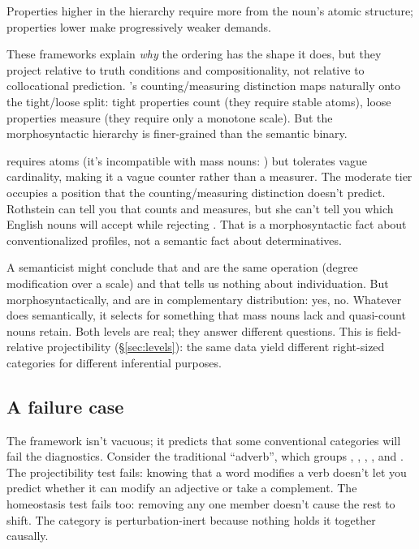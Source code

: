 \documentclass[12pt,a4paper]{article}
\begin{document}
Properties higher in the hierarchy require more from the noun's atomic structure; properties lower make progressively weaker demands.

These frameworks explain \textit{why} the ordering has the shape it does, but they project relative to truth conditions and compositionality, not relative to collocational prediction. \textcite{rothstein2010}'s counting/measuring distinction maps naturally onto the tight/loose split: tight properties count (they require stable atoms), loose properties measure (they require only a monotone scale). But the morphosyntactic hierarchy is finer-grained than the semantic binary.

 requires atoms (it's incompatible with mass nouns: ) but tolerates vague cardinality, making it a vague counter rather than a measurer. The moderate tier occupies a position that the counting/measuring distinction doesn't predict. Rothstein can tell you that  counts and  measures, but she can't tell you which English nouns will accept  while rejecting . That is a morphosyntactic fact about conventionalized profiles, not a semantic fact about determinatives.

A semanticist might conclude that  and  are the same operation (degree modification over a scale) and that  tells us nothing about individuation. But morphosyntactically,  and  are in complementary distribution:  yes,  no. Whatever  does semantically, it selects for something that mass nouns lack and quasi-count nouns retain. Both levels are real; they answer different questions. This is field-relative projectibility (\S\ref{sec:levels}): the same data yield different right-sized categories for different inferential purposes.

\subsection{A failure case}\label{sec:failure-case}

The framework isn't vacuous; it predicts that some conventional categories will fail the diagnostics. Consider the traditional \enquote{adverb}, which groups , , , , and . The projectibility test fails: knowing that a word modifies a verb doesn't let you predict whether it can modify an adjective or take a complement. The homeostasis test fails too: removing any one member doesn't cause the rest to shift. The category is perturbation-inert because nothing holds it together causally.
\end{document}
